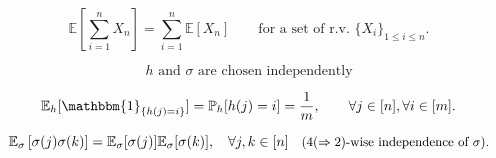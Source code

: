 \documentclass[10pt,usenames,dvipsnames]{article}
\newcommand{\Pbb}{\mathbb{P}}
\newcommand{\Ebb}{\mathbb{E}}
\newcommand{\ind}{\mathbbm{1}} %
\newenvironment{exercise}[2][Exercise]{\begin{trivlist}
  \item[\hskip \labelsep {\bfseries #1}\hskip \labelsep {\bfseries #2.}]}{\end{trivlist}}
\begin{document}
\begin{exercise}{2b}
		\begin{equation}
		\label{eq:linexp}
		\Ebb\left[\sum_{i=1}^n X_n\right] = \sum_{i=1}^n\Ebb\left[ X_n\right] \qquad \mbox{for a set of  r.v. $\{X_i\}_{1\leq i \leq n}$.}
		\end{equation}
		
		\begin{equation}
		\label{eq:s_h_indep}
		\mbox{$h$ and $\sigma$ are chosen independently}
		\end{equation}
		
		\begin{equation}
		\label{eq:h_expectation}
		 \Ebb_{h}[\ind_{\{ h(j) = i\}}] = \Pbb_h[ h(j) = i] = \frac{1}{m}, \qquad \forall j \in [n], \forall i \in [m].
		\end{equation}

		\begin{equation}
		\label{eq:4wise}
		\small
		\Ebb_\sigma\left[\sigma(j)\sigma(k)\right] = \Ebb_\sigma[\sigma(j)]\Ebb_\sigma[\sigma(k)],  \quad \forall j,k \in [n] \quad \mbox{($4 (\Rightarrow 2)$-wise independence of $\sigma$).}
		\normalsize
		\end{equation}


\end{exercise}
\end{document}

